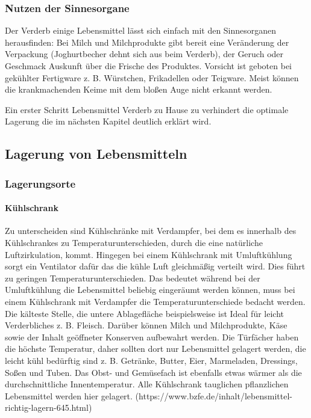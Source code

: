 \subsubsection{Nutzen der Sinnesorgane}
Der Verderb einige Lebensmittel lässt sich einfach mit den Sinnesorganen herausfinden: Bei Milch und Milchprodukte gibt bereit eine Veränderung der Verpackung (Joghurtbecher dehnt sich aus beim Verderb), der Geruch oder Geschmack Auskunft über die Frische des Produktes.
Vorsicht ist geboten bei gekühlter Fertigware z. B. Würstchen, Frikadellen oder Teigware. Meist können die krankmachenden Keime mit dem bloßen Auge nicht erkannt werden.  %

Ein erster Schritt Lebensmittel Verderb zu Hause zu verhindert die optimale Lagerung die im nächsten Kapitel deutlich erklärt wird. %


\subsection{Lagerung von Lebensmitteln}
\subsubsection{Lagerungsorte}
\paragraph{Kühlschrank}
Zu unterscheiden sind Kühlschränke mit Verdampfer, bei dem es innerhalb des Kühlschrankes zu Temperaturunterschieden, durch die eine natürliche Luftzirkulation, kommt. Hingegen bei einem Kühlschrank mit Umluftkühlung sorgt ein Ventilator dafür das die kühle Luft gleichmäßig verteilt wird. Dies führt zu geringen Temperaturunterschieden.
Das bedeutet während bei der Umluftkühlung die Lebensmittel beliebig eingeräumt werden können, muss bei einem Kühlschrank mit Verdampfer die Temperaturunterschiede bedacht werden.
Die kälteste Stelle, die untere Ablagefläche beispielsweise ist Ideal für leicht Verderbliches z. B. Fleisch. Darüber können Milch und Milchprodukte, Käse sowie der Inhalt geöffneter Konserven aufbewahrt werden. Die Türfächer haben die höchste Temperatur, daher sollten dort nur Lebensmittel gelagert werden, die leicht kühl bedürftig sind z. B. Getränke, Butter, Eier, Marmeladen, Dressings, Soßen und Tuben. Das Obst- und Gemüsefach ist ebenfalls etwas wärmer als die durchschnittliche Innentemperatur. Alle Kühlschrank tauglichen pflanzlichen Lebensmittel werden hier gelagert. %
(https://www.bzfe.de/inhalt/lebensmittel-richtig-lagern-645.html)

